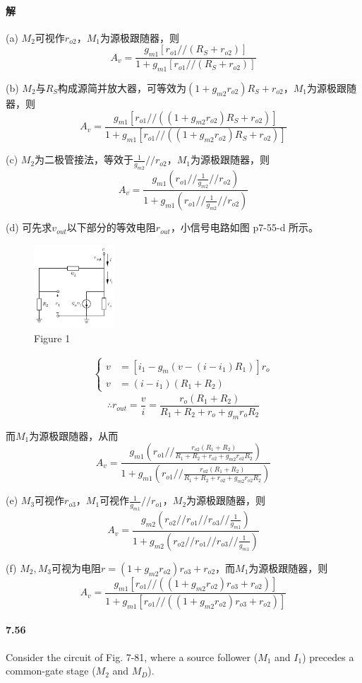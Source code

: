 \documentclass[hyperref, UTF8]{ctexart}
\newcommand{\under}[1]{\frac{1}{#1}}
\newcommand{\underpone}[1]{\frac{#1}{1+#1}}
\begin{document}
\paragraph{解}

    (a) $M_2$可视作$r_{o2}$，$M_1$为源极跟随器，则
    $$A_v = \frac{g_{m1}[r_{o1}//(R_S+r_{o2})]}{1+g_{m1}[r_{o1}//(R_S+r_{o2})]}$$

    (b) $M_2$与$R_S$构成源简并放大器，可等效为$(1+g_{m2}r_{o2})R_S+r_{o2}$，$M_1$为源极跟随器，则
    $$A_v = \underpone{g_{m1}[r_{o1}//((1+g_{m2}r_{o2})R_S+r_{o2})]}$$

    (c) $M_2$为二极管接法，等效于$\under{g_{m2}}//r_{o2}$，$M_1$为源极跟随器，则
    $$A_v = \underpone{g_{m1}(r_{o1}//\under{g_{m2}}//r_{o2})}$$

    (d) 可先求$v_{out}$以下部分的等效电阻$r_{out}$，小信号电路如图 p7-55-d 所示。
    \begin{figure}[!htb]
        \centering
        \includegraphics[width=0.270\textwidth]{p7-55-d-sol.png}
        \caption*{Figure 1}
    \end{figure}    
    \begin{gather*}
        \left\{ \begin{aligned}
            v &= [i_1-g_m(v-(i-i_1)R_1)]r_o \\
            v &= (i-i_1)(R_1+R_2)
        \end{aligned}\right.
    \end{gather*}
    $$\therefore r_{out}=\frac{v}{i}=\frac{r_o(R_1+R_2)}{R_1+R_2+r_o+g_mr_oR_2}$$
    
    而$M_1$为源极跟随器，从而
    $$A_v = \underpone{g_{m1}(r_{o1}//\frac{r_{o2}(R_1+R_2)}{R_1+R_2+r_{o2}+g_{m2}r_{o2}R_2})}$$
    
    (e) $M_3$可视作$r_{o3}$，$M_1$可视作$\under{g_{m1}}//r_{o1}$，$M_2$为源极跟随器，则
    $$A_v = \underpone{g_{m2}(r_{o2}//r_{o1}//r_{o3}//\under{g_{m1}})}$$

    (f) $M_2,M_3$可视为电阻$r=(1+g_{m2}r_{o2})r_{o3}+r_{o2}$，而$M_1$为源极跟随器，则
    $$A_v = \underpone{g_{m1}[r_{o1}//((1+g_{m2}r_{o2})r_{o3}+r_{o2})]}$$

\paragraph{7.56}\label{7.56}
    Consider the circuit of Fig. 7-81, where a source follower ($M_1$ and $I_{1}$) precedes a common-gate stage ($M_2$ and $M_{D}$).
\end{document}
